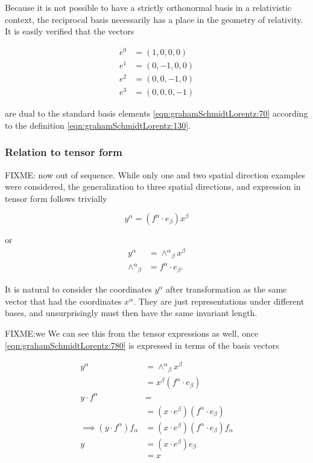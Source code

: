 Because it is not possible to have a strictly orthonormal basis in a relativistic context, the reciprocal basis necessarily has a place in the geometry of relativity.
It is easily verified that the vectors

\begin{equation}\label{eqn:grahamSchmidtLorentz:70b}
\begin{aligned}
e^0 &= (1, 0, 0, 0) \\
e^1 &= (0, -1, 0, 0) \\
e^2 &= (0, 0, -1, 0) \\
e^3 &= (0, 0, 0, -1)
\end{aligned}
\end{equation}

are dual to the standard basis elements \ref{eqn:grahamSchmidtLorentz:70} according to the definition \ref{eqn:grahamSchmidtLorentz:130}.

\subsubsection{Relation to tensor form}

FIXME: now out of sequence.
While only one and two spatial direction examples were considered, the generalization to three spatial directions, and expression in tensor form follows trivially

\begin{equation}\label{eqn:grahamSchmidtLorentz:760}
y^\alpha =
(f^\alpha \cdot e_\beta )
x^\beta
\end{equation}

or
\begin{align}\label{eqn:grahamSchmidtLorentz:780}
y^\alpha &=
{\wedge^\alpha}_\beta
x^\beta \\
{\wedge^\alpha}_\beta
&=
f^\alpha \cdot e_\beta.
\end{align}

It is natural to consider the coordinates $y^\alpha$ after transformation as the same vector that had the coordinates $x^\alpha$.  They are just representations under different bases, and unsurprisingly must then have the same invariant length.

FIXME:we
We can see this from the tensor expressions as well, once \ref{eqn:grahamSchmidtLorentz:780} is expressed in terms of the basis vectors

\begin{align*}
y^\alpha
&=
{\wedge^\alpha}_\beta
x^\beta \\
&= x^\beta
(f^\alpha \cdot e_\beta)
\\
y \cdot f^\alpha &= \\
&=(x \cdot e^\beta)
(f^\alpha \cdot e_\beta)
\\
\implies
(y \cdot f^\alpha) f_\alpha &= (x \cdot e^\beta)
(f^\alpha \cdot e_\beta)
f_\alpha \\
y
&= (x \cdot e^\beta) e_\beta \\
&= x
\end{align*}

